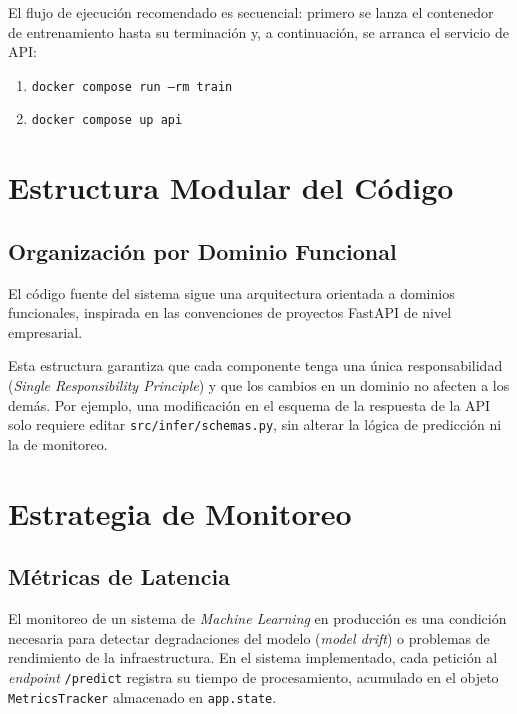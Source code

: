 El flujo de ejecución recomendado es secuencial: primero se lanza el contenedor de entrenamiento hasta su terminación y, a continuación, se arranca el servicio de API:

\begin{enumerate}
    \item \texttt{docker compose run --rm train}
    \item \texttt{docker compose up api}
\end{enumerate}

\section{Estructura Modular del Código}
\label{sec:estructura_modular}

\subsection{Organización por Dominio Funcional}
\label{subsec:organizacion_modular}

El código fuente del sistema sigue una arquitectura orientada a dominios funcionales, inspirada en las convenciones de proyectos FastAPI de nivel empresarial.

Esta estructura garantiza que cada componente tenga una única responsabilidad (\textit{Single Responsibility Principle}) y que los cambios en un dominio no afecten a los demás. Por ejemplo, una modificación en el esquema de la respuesta de la API solo requiere editar \texttt{src/infer/schemas.py}, sin alterar la lógica de predicción ni la de monitoreo.

\section{Estrategia de Monitoreo}
\label{sec:monitoreo}

\subsection{Métricas de Latencia}
\label{subsec:metricas_latencia}

El monitoreo de un sistema de \textit{Machine Learning} en producción es una condición necesaria para detectar degradaciones del modelo (\textit{model drift}) o problemas de rendimiento de la infraestructura. En el sistema implementado, cada petición al \textit{endpoint} \texttt{/predict} registra su tiempo de procesamiento, acumulado en el objeto \texttt{MetricsTracker} almacenado en \texttt{app.state}.

